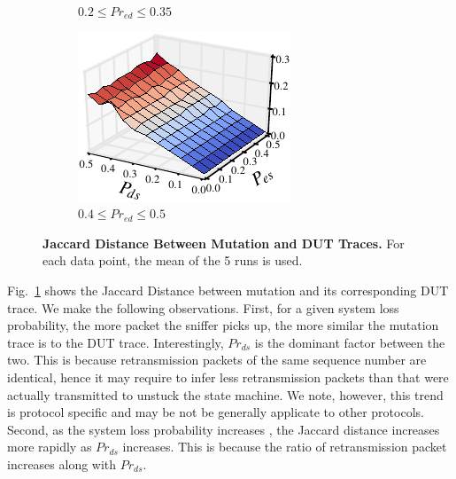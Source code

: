 \begin{figure}[h!]
\begin{subfigure}{0.33\textwidth}
    \caption{$0.2 \le Pr_{ed} \le 0.35$}
  \end{subfigure}\hspace*{0.01\textwidth}
  \begin{subfigure}{0.33\textwidth}
    \centering
    \includegraphics[width=\textwidth]{./figures/scripts/MutationDUTJaccard3DFigure_0_50.pdf}
    \caption{$0.4 \le Pr_{ed} \le 0.5$}
  \end{subfigure}\hspace*{0.01\textwidth}
  \caption{\textbf{Jaccard Distance Between Mutation and DUT Traces.} For each
  data point, the mean of the 5 runs is used.}
  \label{fig:mutation_dut}
  \vspace*{-5mm}
\end{figure}


Fig.~\ref{fig:mutation_dut} shows the Jaccard Distance between mutation and
its corresponding DUT trace.
We make the following observations.
First, for a given system loss probability, the more packet the sniffer picks up,
the more similar the mutation trace is to the DUT trace.
Interestingly, $Pr_{ds}$ is the dominant factor between the two.
This is because retransmission packets of the same sequence number are
identical, hence it may require to infer less retransmission packets than that
were actually transmitted to unstuck the state machine. 
We note, however, this
trend is protocol specific and may be not be generally applicate to other
protocols.
Second, as the system loss probability increases , the Jaccard distance increases
more rapidly as $Pr_{ds}$ increases.
This is because the ratio of retransmission
packet increases along with $Pr_{ds}$.


